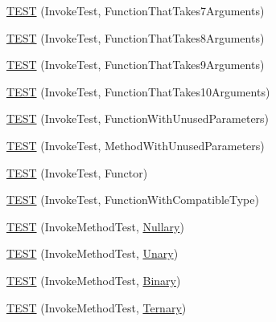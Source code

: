 \begin{DoxyCompactItemize}
\item 
\mbox{\hyperlink{namespacetesting_1_1gmock__more__actions__test_af4756ff87444dc6deb438a350ab5527f}{T\+E\+ST}} (Invoke\+Test, Function\+That\+Takes7\+Arguments)
\item 
\mbox{\hyperlink{namespacetesting_1_1gmock__more__actions__test_a48d99224a323afa3c9772a868dd60214}{T\+E\+ST}} (Invoke\+Test, Function\+That\+Takes8\+Arguments)
\item 
\mbox{\hyperlink{namespacetesting_1_1gmock__more__actions__test_a65d674aacb46d8bf79dbdfe0d49df442}{T\+E\+ST}} (Invoke\+Test, Function\+That\+Takes9\+Arguments)
\item 
\mbox{\hyperlink{namespacetesting_1_1gmock__more__actions__test_a8939ea1ccb0d8787c926c92441b27f6c}{T\+E\+ST}} (Invoke\+Test, Function\+That\+Takes10\+Arguments)
\item 
\mbox{\hyperlink{namespacetesting_1_1gmock__more__actions__test_a0dd6901e637db57c56f1cf8052b6e1bf}{T\+E\+ST}} (Invoke\+Test, Function\+With\+Unused\+Parameters)
\item 
\mbox{\hyperlink{namespacetesting_1_1gmock__more__actions__test_a4f48af38351403b569fc6dfae7787ed2}{T\+E\+ST}} (Invoke\+Test, Method\+With\+Unused\+Parameters)
\item 
\mbox{\hyperlink{namespacetesting_1_1gmock__more__actions__test_ac56a4cb164b338d3f388ed3f4306a5a5}{T\+E\+ST}} (Invoke\+Test, Functor)
\item 
\mbox{\hyperlink{namespacetesting_1_1gmock__more__actions__test_af9dfd7f1d4186ee4de2d9871a19dba5a}{T\+E\+ST}} (Invoke\+Test, Function\+With\+Compatible\+Type)
\item 
\mbox{\hyperlink{namespacetesting_1_1gmock__more__actions__test_abb046fd809977722720c9ce63afd7af5}{T\+E\+ST}} (Invoke\+Method\+Test, \mbox{\hyperlink{namespacetesting_1_1gmock__more__actions__test_acdd2dd80f777fdb770b513b63064ac19}{Nullary}})
\item 
\mbox{\hyperlink{namespacetesting_1_1gmock__more__actions__test_a386ce48f1f0a49e2b94a16deeffc2084}{T\+E\+ST}} (Invoke\+Method\+Test, \mbox{\hyperlink{namespacetesting_1_1gmock__more__actions__test_aad456ea2ee1b0cb2741b676a34f540a3}{Unary}})
\item 
\mbox{\hyperlink{namespacetesting_1_1gmock__more__actions__test_a86221fa7d09853358e38c01b0d6ceced}{T\+E\+ST}} (Invoke\+Method\+Test, \mbox{\hyperlink{namespacetesting_1_1gmock__more__actions__test_a853c9f048674a60798b930750b74a1df}{Binary}})
\item 
\mbox{\hyperlink{namespacetesting_1_1gmock__more__actions__test_a2b98a8a68d37a0bec600227372a1cff8}{T\+E\+ST}} (Invoke\+Method\+Test, \mbox{\hyperlink{namespacetesting_1_1gmock__more__actions__test_ab98b352528a0b72625b4710a6fc648a1}{Ternary}})

\end{DoxyCompactItemize}
